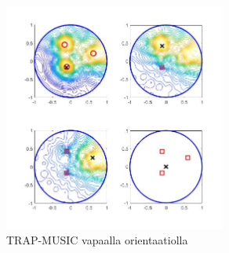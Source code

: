 \begin{figure}[h!]
    \centering
    \includegraphics[width = 0.65\textwidth]{trapp.jpg}
    \caption{TRAP-MUSIC vapaalla orientaatiolla}
    \label{fig:TRAPfree}
\end{figure}

